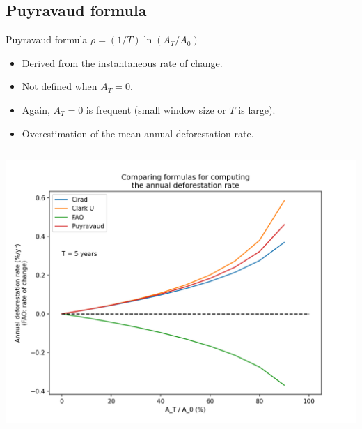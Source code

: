 \documentclass[10pt,table,dvipsnames,compress]{beamer}
\begin{document}
\subsection{Puyravaud formula}
\label{sec:org53f823a}

\begin{frame}[label={sec:org8d0c138}]{Puyravaud formula}
\centering \alert{\alert{\(\rho = (1/T) \ln(A_T/A_0)\)}}
\vspace{0.25cm}

\begin{itemize}
\item Derived from the instantaneous rate of change.
\item Not defined when \(A_T=0\).
\item Again, \(A_T=0\) is frequent (small window size or \(T\) is large).
\item Overestimation of the mean annual deforestation rate.
\end{itemize}

\begin{columns}
\begin{column}{0.5\columnwidth}
\begin{center}
\includegraphics[width=\textwidth]{figs/D-perc-relationship.png}
\end{center}
\end{column}


\end{columns}
\end{frame}
\end{document}

